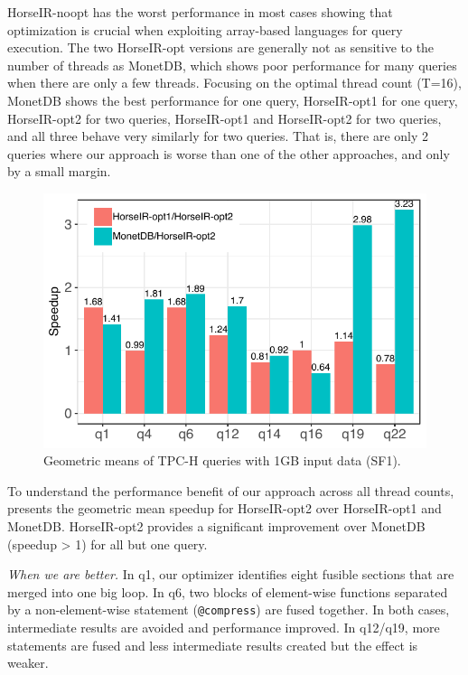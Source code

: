 HorseIR-noopt has the worst performance in most cases showing that optimization is
crucial when exploiting array-based languages for query
execution. The two HorseIR-opt versions are generally not as sensitive to the
number of threads as MonetDB, which shows poor performance for many
queries when there are only a few threads. 
Focusing on the optimal thread count (T=16), MonetDB shows the best
performance for one query, HorseIR-opt1 for one query, HorseIR-opt2 for two
queries, HorseIR-opt1 and HorseIR-opt2 for two queries, and all three behave
very similarly for two queries. That is, there are only 2 queries where our
approach is worse than one of the other approaches, and only by a small margin.

\begin{figure}[htbp]
\centering
\includegraphics[width=.85\columnwidth]{./src/figure/sf1-speedup.pdf}
\vspace{-3mm}
\caption{Geometric means of TPC-H queries with 1GB input data (SF1).}
\label{fig:tpch_sf1_speedup}
\end{figure}

To understand the performance benefit of our approach across all thread counts, 
 presents the geometric mean speedup for HorseIR-opt2
over HorseIR-opt1 and MonetDB. HorseIR-opt2 provides a significant improvement over
MonetDB (speedup > 1) for all but one query. 

\textit{When we are better.}
In q1, our optimizer identifies eight fusible sections that are merged into one
big loop. In q6, two blocks of element-wise functions separated by a non-element-wise
statement (\texttt{@compress}) are fused together. In both cases, intermediate
results are avoided and performance improved. In q12/q19, more statements
are fused and less intermediate results created but the effect is weaker.

